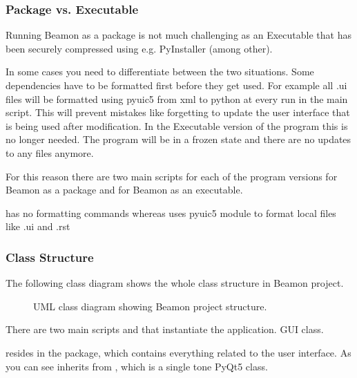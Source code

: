 \documentclass[letterpaper,10pt,english]{sphinxmanual}
\begin{document}
\subsubsection{Package vs. Executable}
\label{\detokenize{implementation:package-vs-executable}}
Running Beamon as a package is not much challenging as an Executable that has been securely compressed using
e.g. PyInstaller (among other).

In some cases you need to differentiate between the two situations.
Some dependencies have to be formatted first before they get used. For example all .ui files will be formatted
using pyuic5 from xml to python at every run in the main script. This will prevent mistakes like forgetting
to update the user interface that is being used after modification.
In the Executable version of the program this is no longer needed. The program will be in a frozen state and there
are no updates to any files anymore.

For this reason there are two main scripts for each of the program versions
 for Beamon as a package and  for Beamon as an executable.

 has no formatting commands whereas  uses pyuic5 module to format local files like .ui and
.rst


\subsubsection{Class Structure}
\label{\detokenize{implementation:class-structure}}
The following class diagram shows the whole class structure in Beamon project.

\begin{figure}[htbp]
\centering
\capstart

\noindent{}
\caption{UML class diagram showing Beamon project structure.}\label{\detokenize{implementation:id3}}\end{figure}

There are two main scripts  and  that instantiate the application.
 GUI class.

 resides in the  package, which contains everything related to the user interface.
As you can see  inherits from , which is a single tone PyQt5 class.
\end{document}
